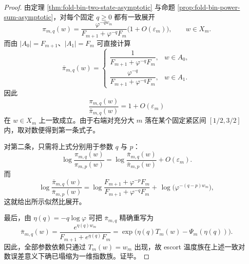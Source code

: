 \begin{proof}
由定理 \ref{thm:fold-bin-two-state-asymptotic} 与命题 \ref{prop:fold-bin-power-sum-asymptotic}，对每个固定 \(q\ge 0\) 都有一致展开
\[
\pi_{m,q}(w)
=
\frac{\varphi^{-q w_m}}{F_{m+1}+\varphi^{-q}F_m}
\bigl(1+O(\varepsilon_m)\bigr),
\qquad
w\in X_m.
\]
而由 \(|A_0|=F_{m+1}\)、\(|A_1|=F_m\) 可直接计算
\[
\bar\pi_{m,q}(w)=
\begin{cases}
\dfrac{1}{F_{m+1}+\varphi^{-q}F_m},& w\in A_0,\\[8pt]
\dfrac{\varphi^{-q}}{F_{m+1}+\varphi^{-q}F_m},& w\in A_1.
\end{cases}
\]
因此
\[
\frac{\pi_{m,q}(w)}{\bar\pi_{m,q}(w)}=1+O(\varepsilon_m)
\]
在 \(w\in X_m\) 上一致成立。由于右端对充分大 \(m\) 落在某个固定紧区间 \([1/2,3/2]\) 内，取对数便得到第一条式子。

对第二条，只需将上式分别用于参数 \(q\) 与 \(p\)：
\[
\log\frac{\pi_{m,q}(w)}{\pi_{m,p}(w)}
=
\log\frac{\bar\pi_{m,q}(w)}{\bar\pi_{m,p}(w)}
+O(\varepsilon_m).
\]
而
\[
\log\frac{\bar\pi_{m,q}(w)}{\bar\pi_{m,p}(w)}
=
\log\frac{F_{m+1}+\varphi^{-p}F_m}{F_{m+1}+\varphi^{-q}F_m}
+\,
\log\!\bigl(\varphi^{-(q-p)w_m}\bigr),
\]
这就给出所示似然比展开。

最后，由 \(\eta(q)=-q\log\varphi\) 可把 \(\bar\pi_{m,q}\) 精确重写为
\[
\bar\pi_{m,q}(w)
=
\frac{e^{\eta(q)w_m}}{F_{m+1}+e^{\eta(q)}F_m}
=
\exp\!\bigl(\eta(q)T_m(w)-\Psi_m(\eta(q))\bigr).
\]
因此，全部参数依赖只通过 \(T_m(w)=w_m\) 出现，故 escort 温度族在上述一致对数误差意义下确已塌缩为一维指数族。证毕。
\end{proof}

